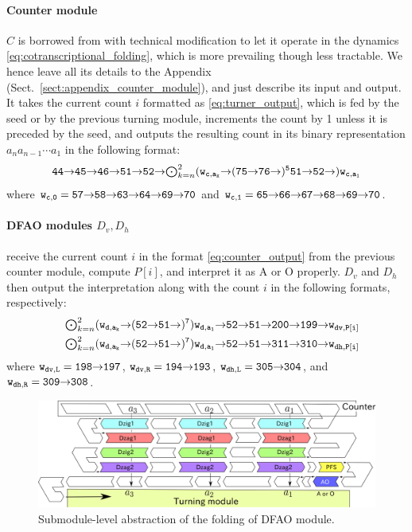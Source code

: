 \documentclass[dvipdfmx,review]{elsarticle}
\newcommand{\east}{{\ensuremath \to}}
\begin{document}
\paragraph{Counter module} $C$ is borrowed from \cite{GeMeScSe2016} with technical modification to let it operate in the dynamics \eqref{eq:cotranscriptional_folding}, which is more prevailing \cite{HanKim2017,HaKiOtSe2016,OtaSeki2017} though less tractable. 
We hence leave all its details to the Appendix (Sect.~\ref{sect:appendix_counter_module}), and just describe its input and output. 
It takes the current count $i$ formatted as \eqref{eq:turner_output}, which is fed by the seed or by the previous turning module, increments the count by 1 unless it is preceded by the seed, and outputs the resulting count in its binary representation $a_n a_{n-1} \cdots a_1$ in the following format:
\begin{equation}\label{eq:counter_output}{\tt 
	44 \east 45 \east 46 \east 51 \east 52 \east \mbox{$\bigodot_{k = n}^2$} (w_{c, a_k} \east (75 \east 76 \east)^5 51 \east 52 \east) w_{c, a_1}
}\end{equation}
where ${\tt w_{c, 0} = 57 \east 58 \east 63 \east 64 \east 69 \east 70}$ and ${\tt w_{c, 1} = 65 \east 66 \east 67 \east 68 \east 69 \east 70}$. 

\paragraph{DFAO modules $D_v, D_h$} receive the current count $i$ in the format \eqref{eq:counter_output} from the previous counter module, compute $P[i]$, and interpret it as A or O properly. 
$D_v$ and $D_h$ then output the interpretation along with the count $i$ in the following formats, respectively: 
\begin{eqnarray}
& & {\tt \mbox{$\bigodot_{k=n}^2$} (w_{d, a_k} \east (52 \east 51 \east)^7) w_{d, a_1} \east 52 \east 51 \east 200 \east 199 \east w_{dv, P[i]}} \label{eq:Dv_output}\\
& & {\tt \mbox{$\bigodot_{k=n}^2$} (w_{d, a_k} \east (52 \east 51 \east)^7) w_{d, a_1} \east 52 \east 51 \east 311 \east 310 \east w_{dh, P[i]}} \label{eq:Dh_output}
\end{eqnarray}
where ${\tt w_{dv, L} = 198 \east 197}$, ${\tt w_{dv, R} = 194 \east 193}$, ${\tt w_{dh, L} = 305 \east 304}$, and ${\tt w_{dh, R} = 309 \east 308}$.

\begin{figure}[tb]
\includegraphics[width=\linewidth]{pics/abst_DFAO.png}
\caption{Submodule-level abstraction of the folding of DFAO module.}
\label{fig:abst_dfao}
\end{figure}
\end{document}
